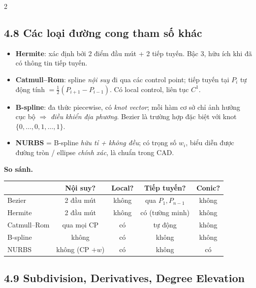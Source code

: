 \begin{paracol}{2}
\switchcolumn

\subsection*{4.8 Các loại đường cong tham số khác}

\begin{itemize}[leftmargin=*,nosep]
  \item \textbf{Hermite}: xác định bởi 2 điểm đầu mút + 2 tiếp tuyến. Bậc 3, hữu ích khi đã có thông tin tiếp tuyến.
  \item \textbf{Catmull--Rom}: spline \emph{nội suy} đi qua các control point; tiếp tuyến tại $P_i$ tự động tính $=\tfrac12(P_{i+1}-P_{i-1})$. Có local control, liên tục $C^1$.
  \item \textbf{B-spline}: đa thức piecewise, có \emph{knot vector}; mỗi hàm cơ sở chỉ ảnh hưởng cục bộ $\Rightarrow$ \emph{điều khiển địa phương}. Bezier là trường hợp đặc biệt với knot $\{0,\dots,0,1,\dots,1\}$.
  \item \textbf{NURBS} = B-spline \emph{hữu tỉ + không đều}; có trọng số $w_i$, biểu diễn được đường tròn / ellipse \emph{chính xác}, là chuẩn trong CAD.
\end{itemize}

\textbf{So sánh.}
\begin{center}\scriptsize
\begin{tabular}{@{}lcccc@{}}\toprule
 & Nội suy? & Local? & Tiếp tuyến? & Conic? \\\midrule
Bezier         & 2 đầu mút       & không & qua $P_1,P_{n-1}$ & không \\
Hermite        & 2 đầu mút       & không & có (tường minh)    & không \\
Catmull--Rom   & qua mọi CP      & có    & tự động            & không \\
B-spline       & không           & có    & không              & không \\
NURBS          & không (CP $+w$) & có    & không              & có \\\bottomrule
\end{tabular}
\end{center}

\switchcolumn*

\subsection*{4.9 Subdivision, Derivatives, Degree Elevation}


\end{paracol}
